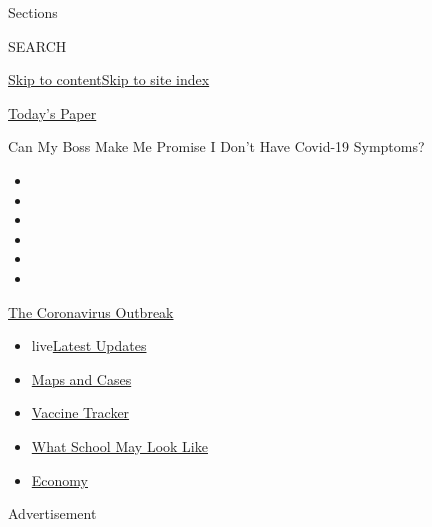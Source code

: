 Sections

SEARCH

\protect\hyperlink{site-content}{Skip to
content}\protect\hyperlink{site-index}{Skip to site index}

\href{https://myaccount.nytimes.com/auth/login?response_type=cookie\&client_id=vi}{}

\href{https://www.nytimes.com/section/todayspaper}{Today's Paper}

Can My Boss Make Me Promise I Don't Have Covid-19 Symptoms?

\begin{itemize}
\item
\item
\item
\item
\item
\item
\end{itemize}

\href{https://www.nytimes.com/news-event/coronavirus?action=click\&pgtype=Article\&state=default\&region=TOP_BANNER\&context=storylines_menu}{The
Coronavirus Outbreak}

\begin{itemize}
\tightlist
\item
  live\href{https://www.nytimes.com/2020/08/01/world/coronavirus-covid-19.html?action=click\&pgtype=Article\&state=default\&region=TOP_BANNER\&context=storylines_menu}{Latest
  Updates}
\item
  \href{https://www.nytimes.com/interactive/2020/us/coronavirus-us-cases.html?action=click\&pgtype=Article\&state=default\&region=TOP_BANNER\&context=storylines_menu}{Maps
  and Cases}
\item
  \href{https://www.nytimes.com/interactive/2020/science/coronavirus-vaccine-tracker.html?action=click\&pgtype=Article\&state=default\&region=TOP_BANNER\&context=storylines_menu}{Vaccine
  Tracker}
\item
  \href{https://www.nytimes.com/interactive/2020/07/29/us/schools-reopening-coronavirus.html?action=click\&pgtype=Article\&state=default\&region=TOP_BANNER\&context=storylines_menu}{What
  School May Look Like}
\item
  \href{https://www.nytimes.com/live/2020/07/31/business/stock-market-today-coronavirus?action=click\&pgtype=Article\&state=default\&region=TOP_BANNER\&context=storylines_menu}{Economy}
\end{itemize}

Advertisement

